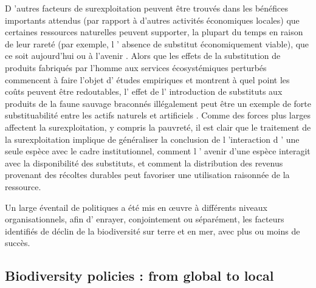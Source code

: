 \begin{displayquote}
\begin{displayquote}
\begin{displayquote}
{	  D 'autres facteurs de surexploitation peuvent être trouvés dans les bénéfices importants attendus (par rapport à d'autres activités économiques locales) que certaines ressources naturelles peuvent supporter, la plupart du temps en raison de leur rareté (par exemple, l ' absence de substitut économiquement viable), que ce soit aujourd'hui ou à l'avenir \citep{Kremer2000}.     Alors que les effets de la substitution de produits fabriqués par l'homme aux services écosystémiques perturbés commencent à faire l'objet d' études empiriques \citep{frank_economic_2024} et montrent à quel point les coûts peuvent être redoutables, l' effet de l' introduction de substituts aux produits de la faune sauvage braconnés illégalement peut être un exemple de forte substituabilité entre les actifs naturels et artificiels \citep{chen_economics_2017}. Comme des forces plus larges affectent la surexploitation, y compris la pauvreté, il est clair que le traitement de la surexploitation implique de généraliser la conclusion de l 'interaction d ' une seule espèce avec le cadre institutionnel, comment l ' avenir d'une espèce interagit avec la disponibilité des substituts, et comment la distribution des revenus provenant des récoltes durables peut favoriser une utilisation raisonnée de la ressource. 

	

	Un large éventail de politiques a été mis en œuvre à différents niveaux organisationnels, afin d' enrayer, conjointement ou séparément, les facteurs identifiés de déclin de la biodiversité sur terre et en mer, avec plus ou moins de succès. 



{}
\subsection*{Biodiversity policies : from global to local}
\par

}
\end{displayquote}
\end{displayquote}
\end{displayquote}
